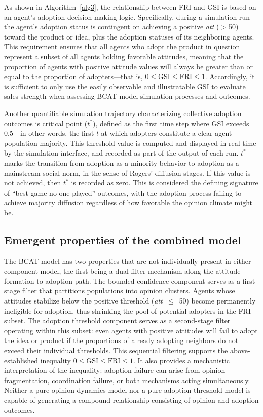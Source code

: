 \documentclass[10pt,letterpaper]{article}
\begin{document}
As shown in Algorithm~\ref{alg3}, the relationship between FRI and GSI is based on an agent's adoption decision-making logic. Specifically, during a simulation run the agent's adoption status is contingent on achieving a positive \textit{att} ($>$50) toward the product or idea, plus the adoption statuses of its neighboring agents. This requirement ensures that all agents who adopt the product in question represent a subset of all agents holding favorable attitudes, meaning that the proportion of agents with positive attitude values will always be greater than or equal to the proportion of adopters---that is, $0 \leq \text{GSI} \leq \text{FRI} \leq 1$. Accordingly, it is sufficient to only use the easily observable and illustratable GSI to evaluate sales strength when assessing BCAT model simulation processes and outcomes.

Another quantifiable simulation trajectory characterizing collective adoption outcomes is critical point ($t^{*}$), defined as the first time step where GSI exceeds 0.5---in other words, the first $t$ at which adopters constitute a clear agent population majority. This threshold value is computed and displayed in real time by the simulation interface, and recorded as part of the output of each run. $t^{*}$ marks the transition from adoption as a minority behavior to adoption as a mainstream social norm, in the sense of Rogers' \cite{Rogers2003} diffusion stages. If this value is not achieved, then $t^{*}$ is recorded as zero. This is considered the defining signature of ``best game no one played'' outcomes, with the adoption process failing to achieve majority diffusion regardless of how favorable the opinion climate might be.

\subsection*{Emergent properties of the combined model}

The BCAT model has two properties that are not individually present in either component model, the first being a dual-filter mechanism along the attitude formation-to-adoption path. The bounded confidence component serves as a first-stage filter that partitions populations into opinion clusters. Agents whose attitudes stabilize below the positive threshold (\textit{att}~$\leq$~50) become permanently ineligible for adoption, thus shrinking the pool of potential adopters in the FRI subset. The adoption threshold component serves as a second-stage filter operating within this subset: even agents with positive attitudes will fail to adopt the idea or product if the proportions of already adopting neighbors do not exceed their individual thresholds. This sequential filtering supports the above-established inequality $0 \leq \text{GSI} \leq \text{FRI} \leq 1$. It also provides a mechanistic interpretation of the inequality: adoption failure can arise from opinion fragmentation, coordination failure, or both mechanisms acting simultaneously. Neither a pure opinion dynamics model nor a pure adoption threshold model is capable of generating a compound relationship consisting of opinion and adoption outcomes.
\end{document}
